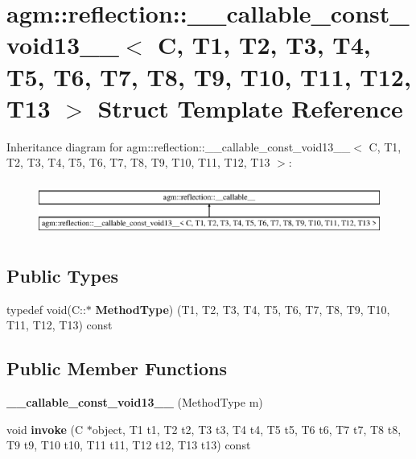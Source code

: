 \hypertarget{structagm_1_1reflection_1_1____callable__const__void13____}{}\section{agm\+:\+:reflection\+:\+:\+\_\+\+\_\+callable\+\_\+const\+\_\+void13\+\_\+\+\_\+$<$ C, T1, T2, T3, T4, T5, T6, T7, T8, T9, T10, T11, T12, T13 $>$ Struct Template Reference}
\label{structagm_1_1reflection_1_1____callable__const__void13____}
Inheritance diagram for agm\+:\+:reflection\+:\+:\+\_\+\+\_\+callable\+\_\+const\+\_\+void13\+\_\+\+\_\+$<$ C, T1, T2, T3, T4, T5, T6, T7, T8, T9, T10, T11, T12, T13 $>$\+:\begin{figure}[H]
\begin{center}
\leavevmode
\includegraphics[height=1.800643cm]{structagm_1_1reflection_1_1____callable__const__void13____}
\end{center}
\end{figure}
\subsection*{Public Types}
\begin{DoxyCompactItemize}
\item 
typedef void(C\+::$\ast$ {\bfseries Method\+Type}) (T1, T2, T3, T4, T5, T6, T7, T8, T9, T10, T11, T12, T13) const \hypertarget{structagm_1_1reflection_1_1____callable__const__void13_____af1b3a3a7ab7932b6b0a7e3e10f7deb97}{}\label{structagm_1_1reflection_1_1____callable__const__void13_____af1b3a3a7ab7932b6b0a7e3e10f7deb97}

\end{DoxyCompactItemize}
\subsection*{Public Member Functions}
\begin{DoxyCompactItemize}
\item 
{\bfseries \+\_\+\+\_\+callable\+\_\+const\+\_\+void13\+\_\+\+\_\+} (Method\+Type m)\hypertarget{structagm_1_1reflection_1_1____callable__const__void13_____a1962eeb7f8015b89af5e95ec1312c973}{}\label{structagm_1_1reflection_1_1____callable__const__void13_____a1962eeb7f8015b89af5e95ec1312c973}

\item 
void {\bfseries invoke} (C $\ast$object, T1 t1, T2 t2, T3 t3, T4 t4, T5 t5, T6 t6, T7 t7, T8 t8, T9 t9, T10 t10, T11 t11, T12 t12, T13 t13) const \hypertarget{structagm_1_1reflection_1_1____callable__const__void13_____a1f3d0766483aec180a002e08528e550b}{}\label{structagm_1_1reflection_1_1____callable__const__void13_____a1f3d0766483aec180a002e08528e550b}

\end{DoxyCompactItemize}

